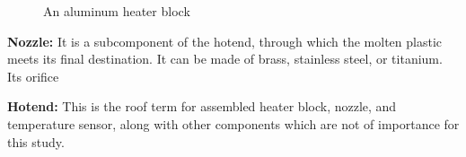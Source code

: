 \begin{figure}[H]
\begin{minipage}{0.45\textwidth}
        \caption{An aluminum heater block \cite{heaterblock}}
    \end{minipage}
\end{figure}

\textbf{Nozzle:} It is a subcomponent of the hotend, through which the molten plastic meets its final destination. It can be made of brass, stainless steel, or titanium. Its orifice

\textbf{Hotend:} This is the roof term for assembled heater block, nozzle, and temperature sensor, along with other components which are not of importance for this study.

